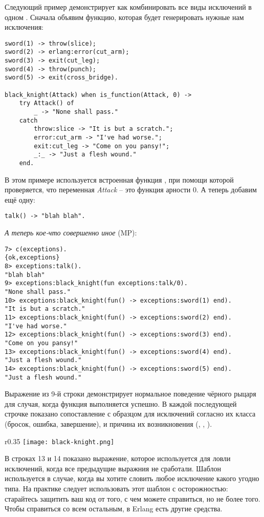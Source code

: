 Следующий пример демонстрирует как комбинировать все виды исключений в одном .
Сначала объявим функцию, которая будет генерировать нужные нам исключения:
\begin{lstlisting}[style=erlang]
sword(1) -> throw(slice);
sword(2) -> erlang:error(cut_arm);
sword(3) -> exit(cut_leg);
sword(4) -> throw(punch);
sword(5) -> exit(cross_bridge).
 
black_knight(Attack) when is_function(Attack, 0) ->
    try Attack() of
        _ -> "None shall pass."
    catch
        throw:slice -> "It is but a scratch.";
        error:cut_arm -> "I've had worse.";
        exit:cut_leg -> "Come on you pansy!";
        _:_ -> "Just a flesh wound."
    end.
\end{lstlisting}

В этом примере используется встроенная функция , при помощи которой проверяется, что переменная \emph{Attack} \--- это функция арности 0. А теперь добавим ещё одну:
\begin{lstlisting}[style=erlang]
talk() -> "blah blah".
\end{lstlisting}
\emph{А теперь кое\--что совершенно иное} (MP):
\begin{lstlisting}[style=erlang]
7> c(exceptions).
{ok,exceptions}
8> exceptions:talk().
"blah blah"
9> exceptions:black_knight(fun exceptions:talk/0).
"None shall pass."
10> exceptions:black_knight(fun() -> exceptions:sword(1) end).
"It is but a scratch."
11> exceptions:black_knight(fun() -> exceptions:sword(2) end).
"I've had worse."
12> exceptions:black_knight(fun() -> exceptions:sword(3) end).
"Come on you pansy!"
13> exceptions:black_knight(fun() -> exceptions:sword(4) end).
"Just a flesh wound."
14> exceptions:black_knight(fun() -> exceptions:sword(5) end).
"Just a flesh wound."
\end{lstlisting}

Выражение из 9\--й строки демонстрирует нормальное поведение чёрного рыцаря для случая, когда функция выполняется успешно.
В каждой последующей строчке показано сопоставление с образцом для исключений согласно их класса (бросок, ошибка, завершение), и причина их возникновения (, , ).

\begin{wrapfigure}{r}{0.35\linewidth}
    \texttt{[image: black-knight.png]}
\end{wrapfigure}

В строках 13 и 14 показано выражение, которое используется для ловли исключений, когда все предыдущие выражния не сработали.
Шаблон \ops{\_:\_} используется в случае, когда вы хотите словить любое исключение какого угодно типа.
На практике следует использовать этот шаблон с осторожностью: старайтесь защитить ваш код от того, с чем можете справиться, но не более того.
Чтобы справиться со всем остальным, в Erlang есть другие средства.


